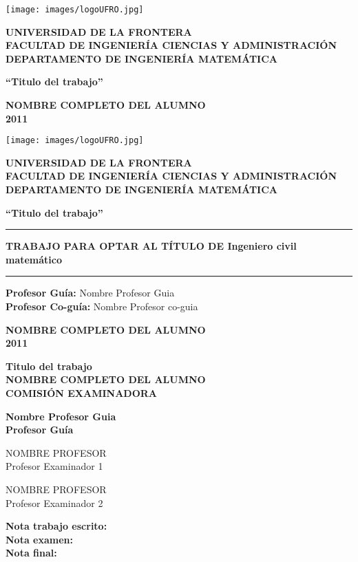\documentclass[letterpaper, 12pt]{article}
\newcommand\universidad{\uppercase{Universidad de la Frontera}}
\newcommand\facultad{\uppercase{Facultad de Ingeniería Ciencias y Administración}}
\newcommand\departamento{\uppercase{Departamento de Ingeniería Matemática}}
\newcommand\tituloTrabajo{Titulo del trabajo}
\newcommand\nombrecompleto{\uppercase{nombre completo del alumno}}
\newcommand\annotrabajo{2011}
\newcommand\titulocarrera{Ingeniero civil matemático}
\newcommand\profesorguia{Nombre Profesor Guia}
\newcommand\profesorcoguia{Nombre Profesor co-guia}
\newcommand\footer{
\begin{minipage}[b]{\textwidth}
\begin{center}
		\textbf{
			\nombrecompleto\\
			\annotrabajo
		}
\end{center}
\end{minipage}
}
\newcommand\header{
\begin{minipage}{0.1\textwidth}
\texttt{[image: images/logoUFRO.jpg]}
\end{minipage}
\hfill
\begin{minipage}{0.9\textwidth}
\begin{center}
		\bf \universidad\\
		\facultad\\
		\departamento
\end{center}	
\end{minipage}
}
\newcommand\boxtitle{
\begin{minipage}{\textwidth}
	\begin{center}
		\textbf{ ``\tituloTrabajo''}
	\end{center}
\end{minipage}
}
\begin{document}



\begin{titlepage}
	\header	
	\vfill
	\boxtitle
	\vfill
	\footer
\end{titlepage}

\newpage

\header
\vfill
\boxtitle
\vfill
\hfill
\begin{minipage}{0.6\textwidth}
\begin{center}
	\rule[0mm]{\textwidth}{1mm}
	\textbf{TRABAJO PARA OPTAR AL TÍTULO \newline
	DE \MakeUppercase\titulocarrera \newline}
	\rule[2mm]{\textwidth}{1mm}
\end{center}
\end{minipage}
\vfill
\begin{minipage}{\textwidth}
\begin{flushright}
\textbf{Profesor Guía:} \profesorguia \\
\textbf{Profesor Co-guía:} \profesorcoguia
\end{flushright}
\end{minipage}
\vfill
\footer


\newpage
\begin{minipage}{\textwidth}
\begin{center}
\textbf{
	\MakeUppercase\tituloTrabajo \\
	\MakeUppercase\nombrecompleto \\
	COMISIÓN EXAMINADORA
}
\end{center}
\end{minipage}
\vfill

\begin{minipage}{\textwidth}
\begin{center}
\textbf{
	\MakeUppercase\profesorguia \\
	Profesor Guía
}
\end{center}
\end{minipage}

\vfill

\begin{minipage}{0.5\textwidth}
\begin{center}
NOMBRE PROFESOR \\
Profesor Examinador 1
\end{center}
\end{minipage}
\hfill
\begin{minipage}{0.5\textwidth}
\begin{center}
NOMBRE PROFESOR \\
Profesor Examinador 2
\end{center}
\end{minipage}

\vfill
\hfill
\begin{minipage}{0.5\textwidth}
\begin{flushleft}
\textbf{ Nota trabajo escrito: \\
	Nota examen: \\
	Nota final: \\
}
\end{flushleft}
\end{minipage}


\end{document}
